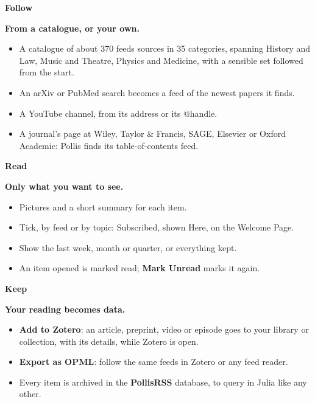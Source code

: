 \documentclass[10pt,a4paper]{article}
\newcommand{\collabmode}[4]{%
  \begin{tcolorbox}[enhanced, colback=white, colframe=navy, boxrule=0.6pt, arc=3pt,
     left=7pt,right=7pt,top=7pt,bottom=7pt, fontupper=\small\raggedright]
   {\color{navy}\large\bfseries #1}\hfill{\footnotesize\color{soft}#2}\par\vspace{2pt}
   {\color{deepamber}\bfseries #3}\par\vspace{4pt}
   #4
  \end{tcolorbox}}
\begin{document}
\vspace{4mm}
\begin{tcbraster}[raster columns=3, raster equal height, raster column skip=3mm]
\collabmode{Follow}{}{From a catalogue, or your own.}{%
  \begin{itemize}[leftmargin=1em]
  \item A catalogue of about 370 feeds sources in 35 categories, spanning History and Law, Music and Theatre, Physics and Medicine, with a sensible set followed from the start.
  \item An arXiv or PubMed search becomes a feed of the newest papers it finds.
  \item A YouTube channel, from its address or its @handle.
  \item A journal's page at Wiley, Taylor \& Francis, SAGE, Elsevier or Oxford Academic: Pollis finds its table-of-contents feed.
  \end{itemize}}
\collabmode{Read}{}{Only what you want to see.}{%
  \begin{itemize}[leftmargin=1em]
  \item Pictures and a short summary for each item.
  \item Tick, by feed or by topic: Subscribed, shown Here, on the Welcome Page.
  \item Show the last week, month or quarter, or everything kept.
  \item An item opened is marked read; \textbf{Mark Unread} marks it again.
  \end{itemize}}
\collabmode{Keep}{}{Your reading becomes data.}{%
  \begin{itemize}[leftmargin=1em]
  \item \textbf{Add to Zotero}: an article, preprint, video or episode goes to your library or collection, with its details, while Zotero is open.
  \item \textbf{Export as OPML}: follow the same feeds in Zotero or any feed reader.
  \item Every item is archived in the \textbf{PollisRSS} database, to query in Julia like any other.
  \end{itemize}}
\end{tcbraster}
\end{document}
